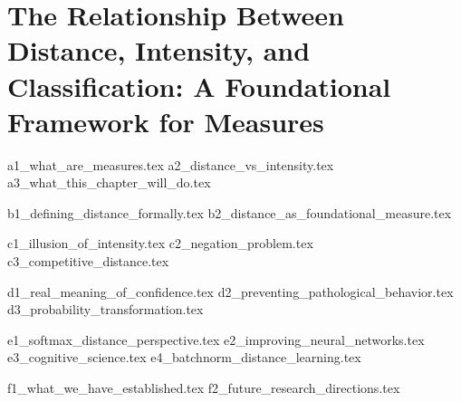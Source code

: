 \documentclass[12pt]{article}
\begin{document}
\section*{The Relationship Between Distance, Intensity, and Classification: A Foundational Framework for Measures}

{a1_what_are_measures.tex}
{a2_distance_vs_intensity.tex}
{a3_what_this_chapter_will_do.tex}

{b1_defining_distance_formally.tex}
{b2_distance_as_foundational_measure.tex}

{c1_illusion_of_intensity.tex}
{c2_negation_problem.tex}
{c3_competitive_distance.tex}

{d1_real_meaning_of_confidence.tex}
{d2_preventing_pathological_behavior.tex}
{d3_probability_transformation.tex}

{e1_softmax_distance_perspective.tex}
{e2_improving_neural_networks.tex}
{e3_cognitive_science.tex}
{e4_batchnorm_distance_learning.tex}

{f1_what_we_have_established.tex}
{f2_future_research_directions.tex}
\end{document}
